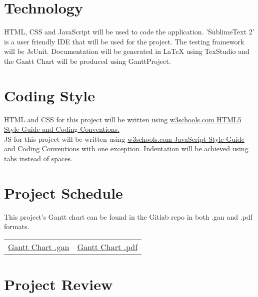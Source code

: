 \documentclass{article}
\begin{document}
	\section{Technology}
	
	HTML, CSS and JavaScript will be used to code the application. 'SublimeText 
	2' is a user 
	friendly
	IDE that will be used for the project. The testing framework will be 
	JsUnit. 
	Documentation will be generated in LaTeX using TexStudio and 
	the Gantt Chart will be produced using GanttProject.
	
	\section{Coding Style}
	
	HTML and CSS for this project will be written using 
	\href{http://www.w3schools.com/html/html5_syntax.asp}
	{w3schools.com HTML5 Style Guide and Coding Conventions.}\\
	
	JS for this project will be written using 
	\href{http://www.w3schools.com/js/js_conventions.asp}
	{w3schools.com JavaScript Style Guide and Coding Conventions} with one 
	exception. Indentation will be achieved using tabs instead of spaces.
	
	\section{Project Schedule}
	 This project's Gantt chart can be found in the Gitlab repo in both .gan 
	 and .pdf formats.
		\begin{table}[H]
			\begin{tabularx}{\textwidth}{cc}		
				\href{https://gitlab.cas.mcmaster.ca/macsidenotes/macsidenotes/blob/master/ProjectSchedule/MacSidenotesProjectSchedule.gan}
				{Gantt Chart .gan} & 
				\href{https://gitlab.cas.mcmaster.ca/macsidenotes/macsidenotes/blob/master/ProjectSchedule/MacSidenotesProjectSchedule.pdf}
				{Gantt Chart .pdf}
			\end{tabularx}
		\end{table}
	
	\section{Project Review}
	
\end{document}
